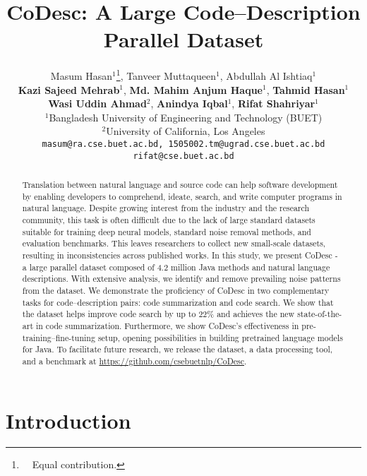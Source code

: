 \documentclass[11pt,a4paper]{article}
\title{CoDesc: A Large Code--Description Parallel Dataset}
\author{
Masum Hasan$^1$\thanks{~~Equal contribution.}, Tanveer Muttaqueen$^1$\footnotemark[1], Abdullah Al Ishtiaq$^1$ \\
\textbf{Kazi Sajeed Mehrab}$^1$, \textbf{Md. Mahim Anjum Haque}$^1$, \textbf{Tahmid Hasan}$^1$ \\
\textbf{Wasi Uddin Ahmad}$^2$, \textbf{Anindya Iqbal}$^1$, \textbf{Rifat Shahriyar}$^1$\\ [3pt]
$^1$Bangladesh University of Engineering and Technology (BUET)\\$^2$University of California, Los Angeles\\ [3pt]
\texttt{masum@ra.cse.buet.ac.bd, 1505002.tm@ugrad.cse.buet.ac.bd}\\
\texttt{rifat@cse.buet.ac.bd}
}
\date{}
\begin{document}
\maketitle
\begin{abstract}




Translation between natural language and source code can help software development by enabling developers to comprehend, ideate, search, and write computer programs in natural language.
Despite growing interest from the industry and the research community, this task is often difficult due to the lack of large standard datasets suitable for training deep neural models, standard noise removal methods, and evaluation benchmarks. This leaves researchers to collect new small-scale datasets, resulting in inconsistencies across published works.
In this study, we present CoDesc - a large parallel dataset composed of 4.2 million Java methods and natural language descriptions. With extensive analysis, we identify and remove prevailing noise patterns from the dataset. We demonstrate the proficiency of CoDesc in two complementary tasks for code--description pairs: code summarization and code search. We show that the dataset helps improve code search by up to 22\% and achieves the new state-of-the-art in code summarization. Furthermore, we show CoDesc's effectiveness in pre-training--fine-tuning setup, opening possibilities in building pretrained language models for Java. To facilitate future research, we release the dataset, a data processing tool, and a benchmark at \href{https://github.com/csebuetnlp/CoDesc}{https://github.com/csebuetnlp/CoDesc}.











%
 \end{abstract}


\section{Introduction}
\label{sec:introduction}
\end{document}
